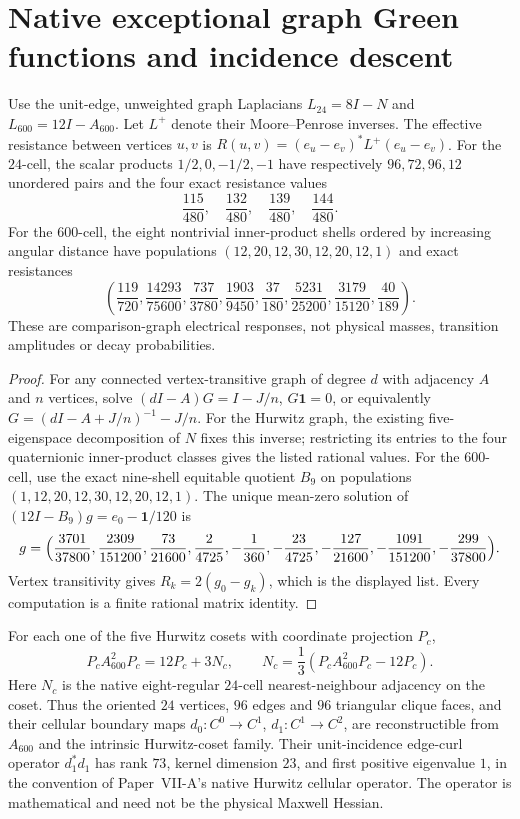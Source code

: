 \documentclass[11pt]{article}
\begin{document}
\section{Native exceptional graph Green functions and incidence descent}
\label{p1b:sec:gc-native-graph-green}
\begin{theorem}
\label{p1b:thm:gc-native-resistance-classes}
Use the unit-edge, unweighted graph Laplacians $L_{24}=8I-N$ and
$L_{600}=12I-A_{600}$. Let $L^+$ denote their Moore--Penrose inverses.
The effective resistance between vertices $u,v$ is
$R(u,v)=(e_u-e_v)^*L^+(e_u-e_v)$.
For the $24$-cell, the scalar products $1/2,0,-1/2,-1$ have respectively
$96,72,96,12$ unordered pairs and the four exact resistance values
\[
 \boxed{\frac{115}{480},\quad \frac{132}{480},\quad
 \frac{139}{480},\quad\frac{144}{480}.}
\]
For the $600$-cell, the eight nontrivial inner-product shells ordered
by increasing angular distance have populations
$(12,20,12,30,12,20,12,1)$ and exact resistances
\[
 \boxed{\left(\frac{119}{720},\frac{14293}{75600},
 \frac{737}{3780},\frac{1903}{9450},\frac{37}{180},
 \frac{5231}{25200},\frac{3179}{15120},\frac{40}{189}\right).}
\]
These are comparison-graph electrical responses, not physical masses,
transition amplitudes or decay probabilities.
\end{theorem}
\begin{proof}
For any connected vertex-transitive graph of degree $d$ with adjacency
$A$ and $n$ vertices, solve
$(dI-A)G=I-J/n$, $G\mathbf1=0$, or equivalently
$G=(dI-A+J/n)^{-1}-J/n$. For the Hurwitz graph, the existing
five-eigenspace decomposition of $N$ fixes this inverse; restricting
its entries to the four quaternionic inner-product classes gives the
listed rational values. For the $600$-cell, use the exact nine-shell
equitable quotient $B_9$ on populations $(1,12,20,12,30,12,20,12,1)$.
The unique mean-zero solution of
$(12I-B_9)g=e_0-\mathbf1/120$ is
\[
 g=\Bigl(\frac{3701}{37800},\frac{2309}{151200},
 \frac{73}{21600},\frac2{4725},-\frac1{360},
 -\frac{23}{4725},-\frac{127}{21600},
 -\frac{1091}{151200},-\frac{299}{37800}\Bigr).
\]
Vertex transitivity gives $R_k=2(g_0-g_k)$, which is the displayed
list. Every computation is a finite rational matrix identity.
\end{proof}
\begin{corollary}
\label{p1b:cor:gc-parent-core-incidence}
For each one of the five Hurwitz cosets with coordinate projection $P_c$,
\[
 \boxed{P_cA_{600}^{2}P_c=12P_c+3N_c,\qquad
 N_c=\frac13(P_cA_{600}^{2}P_c-12P_c).}
\]
Here $N_c$ is the native eight-regular $24$-cell nearest-neighbour
adjacency on the coset. Thus the oriented $24$ vertices, $96$ edges and
$96$ triangular clique faces, and their cellular boundary maps
$d_0:C^0\to C^1$, $d_1:C^1\to C^2$, are reconstructible from $A_{600}$
and the intrinsic Hurwitz-coset family. Their unit-incidence edge-curl
operator $d_1^*d_1$ has rank $73$, kernel dimension $23$, and first
positive eigenvalue $1$, in the convention of Paper~VII-A's native
Hurwitz cellular operator. The operator is mathematical and need not
be the physical Maxwell Hessian.
\end{corollary}
\end{document}
